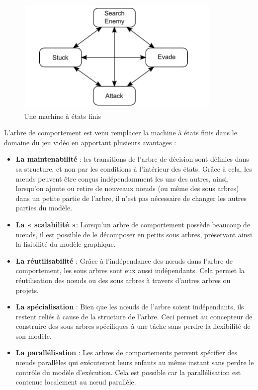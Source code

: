 \documentclass[a4paper, 12pt]{article} %
\begin{document}
\begin{figure}[!h]%
	\begin{center} 
		\includegraphics[width=0.60\columnwidth]{images/fsm.jpg}%
		\caption{Une machine à états finis}%
	\end{center}
\end{figure}

\newpage

L’arbre de comportement est venu remplacer la machine à états finis dans le domaine du jeu vidéo en apportant plusieurs avantages\cite{bt} :

\begin{itemize}
	\item \textbf{La maintenabilité} : les transitions de l’arbre de décision sont définies dans sa structure, et non par les conditions à l’intérieur des états. Grâce à cela, les nœuds peuvent être conçus indépendamment les uns des autres, ainsi, lorsqu’on ajoute ou retire de nouveaux nœuds (ou même des sous arbres) dans un petite partie de l’arbre, il n’est pas nécessaire de changer les autres parties du modèle.
	\item \textbf{La « scalabilité »}: Lorsqu’un arbre de comportement possède beaucoup de nœuds, il est possible de le décomposer en petits sous arbres, préservant ainsi la lisibilité du modèle graphique.
	\item \textbf{La réutilisabilité} : Grâce à l’indépendance des nœuds dans l’arbre de comportement, les sous arbres sont eux aussi indépendants. Cela permet la réutilisation des nœuds ou des sous arbres à travers d’autres arbres ou projets.
	\item \textbf{La spécialisation} : Bien que les nœuds de l’arbre soient indépendants, ils restent reliés à cause de la structure de l’arbre. Ceci permet au concepteur de construire des sous arbres spécifiques à une tâche sans perdre la flexibilité de son modèle.
	\item \textbf{La parallélisation} : Les arbres de comportements peuvent spécifier des nœuds parallèles qui exécuteront leurs enfants au même instant sans perdre le contrôle du modèle d’exécution. Cela est possible car la parallélisation est contenue localement au nœud parallèle.
\end{itemize}
\end{document}

